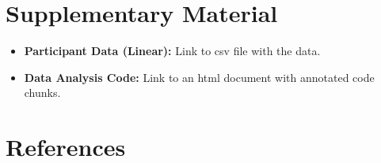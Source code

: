 \documentclass[
]{jds}
\providecommand{\tightlist}{%
  \setlength{\itemsep}{0pt}\setlength{\parskip}{0pt}}\usepackage{longtable,booktabs,array}
\begin{document}
\hypertarget{supplementary-material}{%
\section*{Supplementary Material}\label{supplementary-material}}

\begin{itemize}
\tightlist
\item
  \textbf{Participant Data (Linear):} Link to csv file with the data.
\item
  \textbf{Data Analysis Code:} Link to an html document with annotated
  code chunks.
\end{itemize}

\hypertarget{references}{%
\section*{References}\label{references}}
\end{document}
